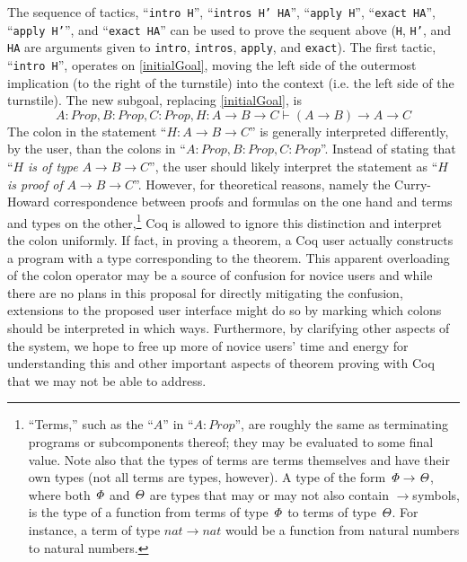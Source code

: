 \documentclass[11pt]{amsart}
\newcommand{\ra}{\ensuremath{\rightarrow}}
\begin{document}
The sequence of tactics, ``\texttt{intro H}'', ``\texttt{intros H' HA}'', ``\texttt{apply H}'', ``\texttt{exact HA}'', ``\texttt{apply H'}'', and ``\texttt{exact HA}'' can be used to prove the sequent above (\texttt{H}, \texttt{H'}, and \texttt{HA} are arguments given to \texttt{intro}, \texttt{intros}, \texttt{apply}, and \texttt{exact}).  The first tactic, ``\texttt{intro H}'', operates on \eqref{initialGoal}, moving the left side of the outermost implication (to the right of the turnstile) into the context (i.e. the left side of the turnstile).  The new subgoal, replacing \eqref{initialGoal}, is
\begin{equation}\label{introHResult}A : Prop, B : Prop, C : Prop, H : A \ra B \ra C \vdash (A \ra B) \ra A \ra C\end{equation}
The colon in the statement ``$H : A \ra B \ra C$'' is generally interpreted differently, by the user, than the colons in ``$A : Prop, B : Prop, C : Prop$''.  Instead of stating that ``$H$ \textit{is of type} $A \ra B \ra C$'', the user should likely interpret the statement as ``$H$ \textit{is proof of} $A \ra B \ra C$''.  However, for theoretical reasons, namely the Curry-Howard correspondence between proofs and formulas on the one hand and terms and types on the other,\footnote{``Terms,'' such as the ``$A$'' in ``$A : Prop$'', are roughly the same as terminating programs or subcomponents thereof; they may be evaluated to some final value.  Note also that the types of terms are terms themselves and have their own types (not all terms are types, however).  A type of the form $\it{\Phi} \ra \it{\Theta}$, where both $\it{\Phi}$ and $\it{\Theta}$ are types that may or may not also contain \ra symbols, is the type of a function from terms of type $\it{\Phi}$ to terms of type $\it{\Theta}$.  For instance, a term of type $nat \ra nat$ would be a function from natural numbers to natural numbers.} Coq is allowed to ignore this distinction and interpret the colon uniformly.  If fact, in proving a theorem, a Coq user actually constructs a program with a type corresponding to the theorem.  This apparent overloading of the colon operator may be a source of confusion for novice users and while there are no plans in this proposal for directly mitigating the confusion, extensions to the proposed user interface might do so by marking which colons should be interpreted in which ways.  Furthermore, by clarifying other aspects of the system, we hope to free up more of novice users' time and energy for understanding this and other important aspects of theorem proving with Coq that we may not be able to address. 
\end{document}
